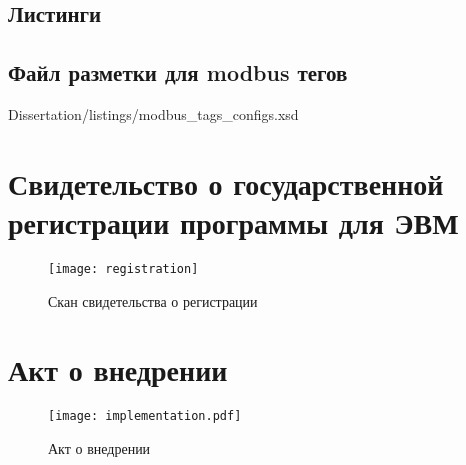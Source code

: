 \begin{landscape}
\chapter{Листинги}
\section{Файл разметки для modbus тегов}


        {Dissertation/listings/modbus_tags_configs.xsd}

\end{landscape}

\chapter{Свидетельство о государственной регистрации программы для ЭВМ}\label{ch:app1}


\begin{center}
    \begin{figure}[hb]
        \texttt{[image: registration]}
        \caption{Скан свидетельства о регистрации}\label{app:fig:registration}
    \end{figure}
\end{center}
    


\chapter{Акт о внедрении}\label{ch:app2}

\begin{center}
    \begin{figure}[hb]
        \texttt{[image: implementation.pdf]}
        \caption{Акт о внедрении}\label{app:fig:implementation}
    \end{figure}
\end{center}